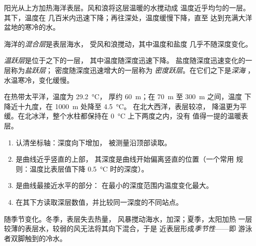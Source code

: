 阳光从上方加热海洋表层。风和浪将这层温暖的水搅动成
温度近乎均匀的一层。其下，温度在
几百米内迅速下降；再往深处，温度缓慢下降，直至
达到充满大洋盆地的寒冷的水。

\begin{definition}[混合层]\label{def:g10:layered-ocean:mixed-layer}
海洋的\emph{混合层}是表层海水，
受风和浪搅动，其中温度和盐度
几乎不随深度变化。
\end{definition}

\begin{definition}\label{def:g10:layered-ocean:thermocline}
\emph{温跃层}是位于之下的一层，
其中温度随深度迅速下降。
盐度随深度迅速变化的一层称为\emph{盐跃层}；
密度随深度迅速增大的一层称为
\emph{密度跃层}。在它们之下是\emph{深海
}，水温寒冷，变化缓慢。
\end{definition}

在热带太平洋，温度为 \qty{29.2}{\degreeCelsius}，
厚约 \qty{60}{m}；在 \qty{70}{m} 至 \qty{300}{m} 之间，温度
下降近十九度，在 \qty{1000}{m} 处降至 \qty{4.5}{\degreeCelsius}。
在北大西洋，表层较凉，
降温更为平缓。在北冰洋，整个水柱都保持在
\qty{0}{\degreeCelsius} 上下两度之内，没有
值得一提的温暖表层。

\begin{method}[读懂海洋剖面]\label{met:g10:layered-ocean:profile}
\begin{enumerate}
  \item 认清坐标轴：深度向下增加，
        被测量沿顶部读取。
  \item {}是曲线近乎竖直的上部，
        其深度是曲线开始偏离竖直的位置（一个常用
        规则：温度比表层值下降 \qty{0.5}{\degreeCelsius}
        时的深度）。
  \item {}是曲线最接近水平的部分：
        在最小的深度范围内温度变化最大。
  \item 在其下方读取深层数值，并比较同一深度的不同站点。
\end{enumerate}
\end{method}

随季节变化。冬季，表层失去热量，
风暴搅动海水，加深；夏季，太阳加热
一层较薄的表层水，较弱的风无法将其向下混合，于是
近表层形成\emph{季节性}——即
游泳者双脚触到的冷水。

